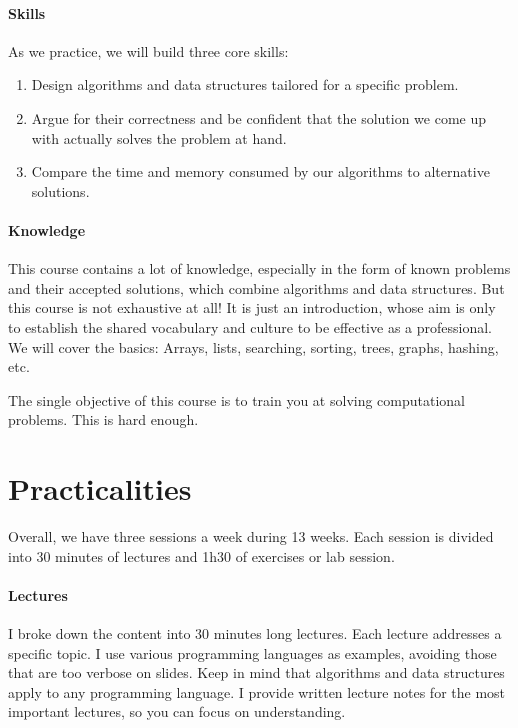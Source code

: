 \documentclass{aldast}
\begin{document}
\paragraph{Skills}
As we practice, we will build three core skills:
\begin{enumerate}
\item Design algorithms and data structures tailored for a specific
  problem.
\item Argue for their correctness and be confident that the solution
  we come up with actually solves the problem at hand.
\item Compare the time and memory consumed by our algorithms to
  alternative solutions.
\end{enumerate}

\paragraph{Knowledge}
This course contains a lot of knowledge, especially in the form of
known problems and their accepted solutions, which combine algorithms
and data structures. But this course is not exhaustive at all! It is just
an introduction, whose aim is only to establish the shared vocabulary and
culture to be effective as a professional. We will cover the basics:
Arrays, lists, searching, sorting, trees, graphs, hashing, etc.

\begin{takeaway}
  The single objective of this course is to train you at solving
  computational problems. This is hard enough.
\end{takeaway}


\section{Practicalities}
Overall, we have three sessions a week during 13 weeks. Each session
is divided into 30 minutes of lectures and 1h30 of exercises or lab
session.

\paragraph {Lectures}
I broke down the content into 30 minutes long lectures. Each lecture
addresses a specific topic. I use various programming languages as
examples, avoiding those that are too verbose on slides. Keep in mind
that algorithms and data structures apply to any programming
language. I provide written lecture notes for the most important
lectures, so you can focus on understanding.
\end{document}
